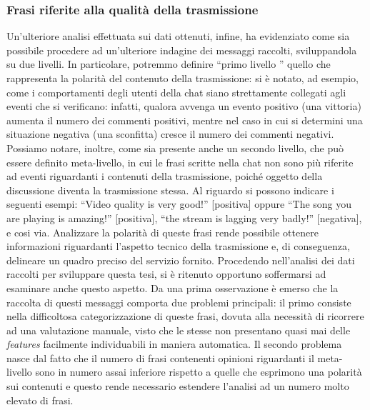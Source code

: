 \documentclass[a4paper,12pt,openright,twoside]{report}
\theoremstyle{definition}
\begin{document}
\subsubsection{Frasi riferite alla qualità della trasmissione}
Un'ulteriore analisi effettuata sui dati ottenuti, infine, ha evidenziato come 
sia possibile procedere ad un'ulteriore indagine dei messaggi raccolti, 
sviluppandola su due livelli. In particolare, potremmo definire ``primo livello ''  
quello che rappresenta la polarità del contenuto della trasmissione: si è notato, 
ad esempio, come i comportamenti degli utenti della chat siano strettamente collegati  
agli eventi che si verificano: infatti, qualora  avvenga un evento positivo 
(una vittoria) aumenta il numero dei commenti positivi, mentre nel caso in cui 
si determini una situazione negativa (una sconfitta) cresce il numero dei commenti negativi. 
Possiamo notare, inoltre,  come sia presente anche un secondo livello, 
che può essere definito meta-livello, in cui le frasi scritte nella chat
non sono più riferite ad eventi riguardanti i contenuti della trasmissione, 
poiché oggetto della discussione diventa la trasmissione stessa. 
Al riguardo si possono indicare i seguenti esempi: 
``Video quality is very good!'' [positiva] oppure 
``The song you are playing is amazing!'' [positiva], 
``the stream is lagging very badly!'' [negativa], e cosi via.
Analizzare la polarità di queste frasi rende possibile ottenere informazioni 
riguardanti l'aspetto tecnico della trasmissione e, di conseguenza,
delineare un quadro preciso del servizio fornito.
Procedendo nell'analisi dei dati raccolti per sviluppare questa tesi, 
si è ritenuto opportuno soffermarsi ad esaminare anche questo aspetto. 
Da una prima osservazione è emerso che la raccolta di questi messaggi 
comporta due problemi principali: il primo consiste nella difficoltosa 
categorizzazione di queste frasi, dovuta alla necessità di ricorrere ad una 
valutazione manuale, visto che le stesse non presentano quasi mai delle 
\emph{features} facilmente individuabili in maniera automatica. 
Il secondo problema nasce dal fatto che il numero di frasi contenenti opinioni 
riguardanti il meta-livello sono in numero assai inferiore  
rispetto a quelle che esprimono una polarità sui contenuti e questo 
rende necessario estendere l’analisi ad un numero molto elevato di frasi.




\end{document}
